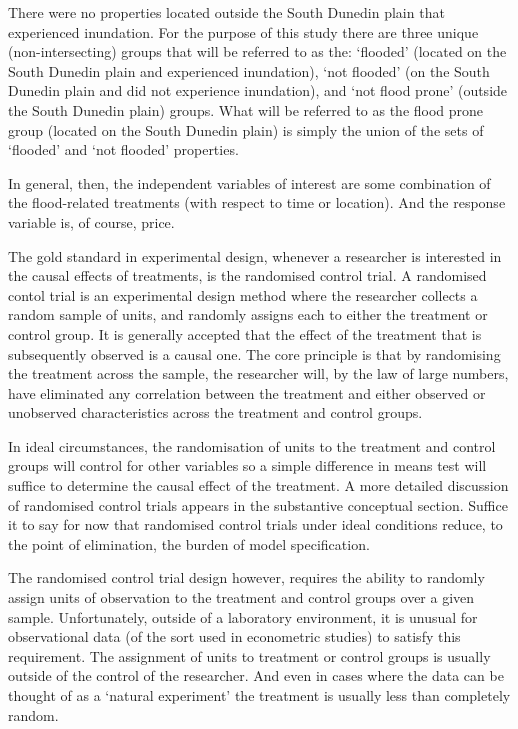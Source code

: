 \documentclass[]{article}
\begin{document}
There were no properties located outside the South Dunedin plain that
experienced inundation. For the purpose of this study there are three
unique (non-intersecting) groups that will be referred to as the:
`flooded' (located on the South Dunedin plain and experienced
inundation), `not flooded' (on the South Dunedin plain and did not
experience inundation), and `not flood prone' (outside the South Dunedin
plain) groups. What will be referred to as the flood prone group
(located on the South Dunedin plain) is simply the union of the sets of
`flooded' and `not flooded' properties.

In general, then, the independent variables of interest are some
combination of the flood-related treatments (with respect to time or
location). And the response variable is, of course, price.

The gold standard in experimental design, whenever a researcher is
interested in the causal effects of treatments, is the randomised
control trial. A randomised contol trial is an experimental design
method where the researcher collects a random sample of units, and
randomly assigns each to either the treatment or control group. It is
generally accepted that the effect of the treatment that is subsequently
observed is a causal one. The core principle is that by randomising the
treatment across the sample, the researcher will, by the law of large
numbers, have eliminated any correlation between the treatment and
either observed or unobserved characteristics across the treatment and
control groups.

In ideal circumstances, the randomisation of units to the treatment and
control groups will control for other variables so a simple difference
in means test will suffice to determine the causal effect of the
treatment. A more detailed discussion of randomised control trials
appears in the substantive conceptual section. Suffice it to say for now
that randomised control trials under ideal conditions reduce, to the
point of elimination, the burden of model specification.

The randomised control trial design however, requires the ability to
randomly assign units of observation to the treatment and control groups
over a given sample. Unfortunately, outside of a laboratory environment,
it is unusual for observational data (of the sort used in econometric
studies) to satisfy this requirement. The assignment of units to
treatment or control groups is usually outside of the control of the
researcher. And even in cases where the data can be thought of as a
`natural experiment' the treatment is usually less than completely
random.
\end{document}
